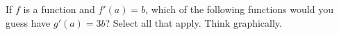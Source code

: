 \documentclass{ximera}
\begin{document}
\begin{question}
If $f$ is a function and $f'(a)= b $, which of the following functions would you guess have $g'(a) = 3b$?  Select all that apply.  Think graphically.

\begin{selectAll}
\end{selectAll}
\end{question}



\end{document}
